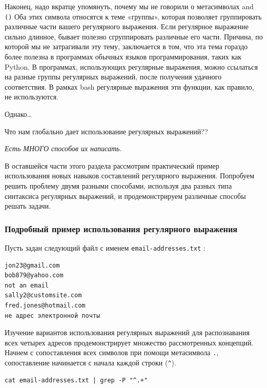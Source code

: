 \documentclass[12pt]{article}
\begin{document}
Наконец, надо вкратце упомянуть, почему мы не говорили о метасимволах
\texttt{\textbar{}} and \texttt{()} Оба этих символа относятся к теме
«группы», которая позволяет группировать различные части вашего
регулярного выражения. Если регулярное выражение сильно длинное, бывает
полезно сгруппировать различные его части. Причина, по которой мы не
затрагивали эту тему, заключается в том, что эта тема гораздо более
полезна в программах обычных языков программирования, таких как Python.
В программах, использующих регулярные выражения, можно ссылаться на
разные группы регулярных выражений, после получения удачного
соответствия. В рамках bash регулярные выражения эти функции, как
правило, не используются.

Однако\ldots{}

Что нам глобально дает использование регулярных выражений??

\emph{Есть МНОГО способов их написать}.

В оставшейся части этого раздела рассмотрим практический пример
использования новых навыков составлений регулярного выражения. Попробуем
решить проблему двумя разными способами, используя два разных типа
синтаксиса регулярных выражений, и продемонстрируем различные способы
решать задачи.

\hypertarget{Detailed-Example-Regular-Expression}{%
\subsubsection{\texorpdfstring{\protect\hyperlink{Detailed-Example-Regular-Expression}{}Подробный
пример использования регулярного
выражения}{Подробный пример использования регулярного выражения}}\label{Detailed-Example-Regular-Expression}}

Пусть задан следующий файл с именем \texttt{email-addresses.txt} :

\begin{verbatim}
jon23@gmail.com
bob879@yahoo.com
not an email
sally2@customsite.com
fred.jones@hotmail.com
не адрес электронной почты
\end{verbatim}

Изучение вариантов использования регулярных выражений для распознавания
всех четырех адресов продемонстрирует множество рассмотренных концепций.
Начнем с сопоставления всех символов при помощи метасимвола \texttt{.},
сопоставление начинается с начала каждой строки (\texttt{\^{}}).

\begin{verbatim}
cat email-addresses.txt | grep -P "^.+"
\end{verbatim}
\end{document}
